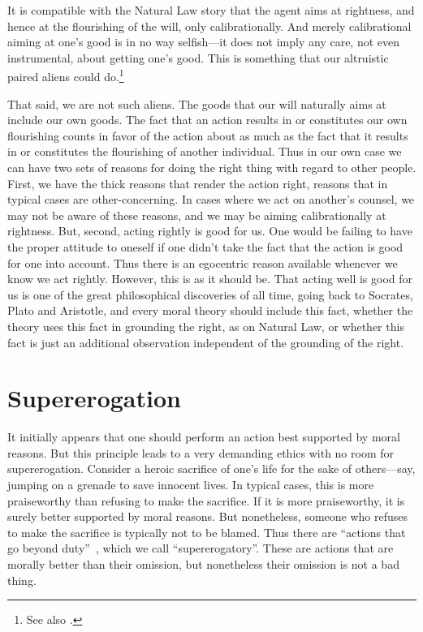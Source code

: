 It is compatible with the Natural Law story that the agent aims at rightness, and hence at the flourishing of the will, only
calibrationally. And merely calibrational aiming at one's good is in no way selfish---it does not imply any care, not even instrumental,
about getting one's good. This is something that our altruistic paired aliens could do.\footnote{See also 
.}

That said, we are not such aliens. The goods that our will naturally aims at include our own goods. The fact that an action 
results in or constitutes our own flourishing counts in favor of the action about as much as the fact that it results in or constitutes the
flourishing of another individual. Thus in our own case we can have two sets of reasons for doing the right thing with regard to other
people. First, we have the thick reasons that render the action right, reasons that in typical cases are other-concerning. In cases where
we act on another's counsel, we may not be aware of these reasons, and we may be aiming calibrationally at rightness. But, second, acting
rightly is good for us. One would be failing to have the proper attitude to oneself if one didn't take the fact that the action is good
for one into account. Thus there is an egocentric reason available whenever we know we act rightly. However, this is as it should be.
That acting well is good for us is one of the great philosophical discoveries of all time, going back to Socrates, Plato and Aristotle,
and every moral theory should include this fact, whether the theory uses this fact in grounding the right, as on Natural Law, or whether
this fact is just an additional observation independent of the grounding of the right. 

\section{Supererogation}\label{sec:superero}
It initially appears that one should perform an action best supported by moral reasons. But this principle
leads to a very demanding ethics with no room for supererogation. Consider a heroic sacrifice of one's life for
the sake of others---say, jumping on a grenade to save innocent lives. In typical cases, this is more praiseworthy 
than refusing to make the sacrifice. If it is more praiseworthy, it is surely better supported by moral reasons. 
But nonetheless, someone who refuses to make the sacrifice is typically not to be blamed. Thus there are ``actions
that go beyond duty''~\parencite[p.~209]{Urmson}, which we call ``supererogatory''. These are actions that are
morally better than their omission, but nonetheless their omission is not a bad thing.

